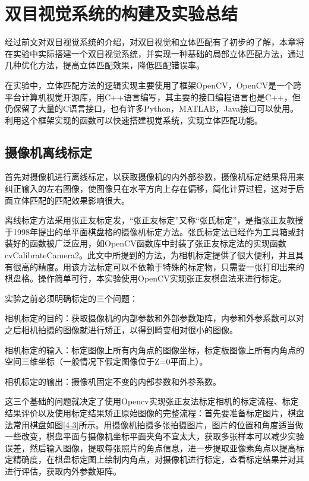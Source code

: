 
\chapter{双目视觉系统的构建及实验总结}
经过前文对双目视觉系统的介绍，对双目视觉和立体匹配有了初步的了解，本章将在实验中实际搭建一个双目视觉系统，并实现一种基础的局部立体匹配方法，通过几种优化方法，提高立体匹配效果，降低匹配错误率。

在实验中，立体匹配方法的逻辑实现主要使用了框架OpenCV，OpenCV是一个跨平台计算机视觉开源库，用C++语言编写，其主要的接口编程语言也是C++，但仍保留了大量的C语言接口，也有许多Python，MATLAB，Java接口可以使用。利用这个框架实现的函数可以快速搭建视觉系统，实现立体匹配功能。

\section{摄像机离线标定}
首先对摄像机进行离线标定，以获取摄像机的内外部参数，摄像机标定结果将用来纠正输入的左右图像，使图像只在水平方向上存在偏移，简化计算过程，这对于后面立体匹配的匹配效果影响很大。

离线标定方法采用张正友标定发，“张正友标定”又称“张氏标定”，是指张正友教授于1998年提出的单平面棋盘格的摄像机标定方法。张氏标定法已经作为工具箱或封装好的函数被广泛应用，如OpenCV函数库中封装了张正友标定法的实现函数cvCalibrateCamera2。此文中所提到的方法，为相机标定提供了很大便利，并且具有很高的精度。用该方法标定可以不依赖于特殊的标定物，只需要一张打印出来的棋盘格。操作简单可行，本实验使用OpenCV实现张正友棋盘法来进行标定。

实验之前必须明确标定的三个问题：

相机标定的目的：获取摄像机的内部参数和外部参数矩阵，内参和外参系数可以对之后相机拍摄的图像就进行矫正，以得到畸变相对很小的图像。

相机标定的输入：标定图像上所有内角点的图像坐标，标定板图像上所有内角点的空间三维坐标（一般情况下假定图像位于Z=0平面上）。

相机标定的输出：摄像机固定不变的内部参数和外参系数。

这三个基础的问题就决定了使用Opencv实现张正友法标定相机的标定流程、标定结果评价以及使用标定结果矫正原始图像的完整流程：首先要准备标定图片，棋盘法常用棋盘如图\ref{4-3}所示。用摄像机拍摄多张拍摄图片，图片的位置和角度适当做一些改变，棋盘平面与摄像机坐标平面夹角不宜太大，获取多张样本可以减少实验误差，然后输入图像，提取每张照片的角点信息，进一步提取亚像素角点以提高标定精确度，在棋盘标定图上绘制内角点，对摄像机进行标定，查看标定结果并对其进行评估，获取内外参数矩阵。

